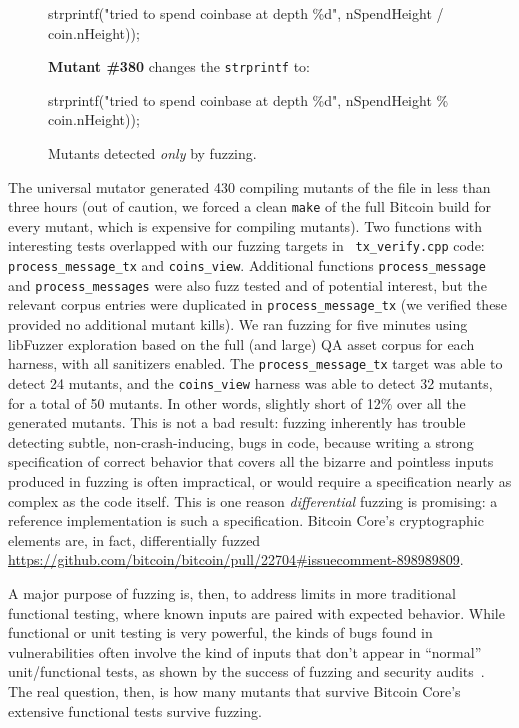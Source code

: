 \begin{sloppypar}
\begin{figure}
\begin{code}
strprintf("tried to spend coinbase at depth \%d", nSpendHeight / coin.nHeight));
\end{code}
      
{\bf Mutant \#380} changes the {\tt strprintf} to:      

\begin{code}
strprintf("tried to spend coinbase at depth \%d", nSpendHeight \% coin.nHeight));
\end{code}
\caption{Mutants detected \emph{only} by fuzzing.}
\label{mkills}
\end{figure}

The universal mutator generated 430 compiling mutants of the file in
less than three hours (out of caution, we forced a clean {\tt make} of
the full Bitcoin build for every mutant, which is expensive for
compiling mutants).
Two functions with interesting tests overlapped with our fuzzing targets in {\tt
  tx\_verify.cpp} code: {\tt process\_message\_tx} and {\tt coins\_view}.
Additional functions {\tt process\_message} and {\tt process\_messages} were
also fuzz tested and of potential interest, but the relevant corpus entries were
duplicated in {\tt process\_message\_tx} (we verified these provided no
additional mutant kills). We ran fuzzing for five minutes using
libFuzzer exploration based on the full (and large) QA asset corpus for each
harness, with all sanitizers enabled. The {\tt process\_message\_tx} target was
able to detect 24 mutants, and the {\tt coins\_view} harness was able to detect
32 mutants, for a total of 50 mutants. In other words, slightly short of 12\%
over all the generated mutants. This is not a bad result: fuzzing inherently has
trouble detecting subtle, non-crash-inducing, bugs in code, because writing a
strong specification of correct behavior that covers all the bizarre and
pointless inputs produced in fuzzing is often impractical, or would require a
specification nearly as complex as the code itself. This is one reason
\emph{differential} fuzzing is promising: a reference implementation is such a
specification. Bitcoin Core's cryptographic elements are, in fact,
differentially fuzzed
\url{https://github.com/bitcoin/bitcoin/pull/22704#issuecomment-898989809}.
\end{sloppypar}


A major purpose of fuzzing is, then, to address limits in more
traditional functional testing, where known inputs are paired with
expected behavior.  While functional or unit testing is very powerful,
the kinds of bugs found in vulnerabilities often involve the kind of
inputs that don't appear in ``normal'' unit/functional tests, as shown
by the success of fuzzing and security audits~\cite{FC20}.  The real
question, then, is how many mutants that survive Bitcoin Core's
extensive functional tests survive fuzzing.

